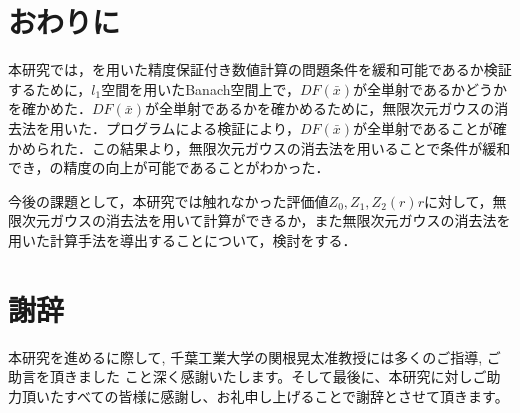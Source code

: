
\chapter{おわりに}

本研究では，\rad{}を用いた精度保証付き数値計算の問題条件を緩和可能であるか検証するために，$l_1$空間を用いたBanach空間上で，$DF(\bar{x})$が全単射であるかどうかを確かめた．$DF(\bar{x})$が全単射であるかを確かめるために，無限次元ガウスの消去法を用いた．プログラムによる検証により，$DF(\bar{x})$が全単射であることが確かめられた．この結果より，無限次元ガウスの消去法を用いることで条件が緩和でき，\rad{}の精度の向上が可能であることがわかった．

今後の課題として，本研究では触れなかった評価値$Z_0, Z_1, Z_2(r)r$に対して，無限次元ガウスの消去法を用いて計算ができるか，また無限次元ガウスの消去法を用いた計算手法を導出することについて，検討をする．

\chapter*{謝辞}
本研究を進めるに際して, 千葉工業大学の関根晃太准教授には多くのご指導, ご助言を頂きました
こと深く感謝いたします。そして最後に、本研究に対しご助力頂いたすべての皆様に感謝し、お礼申し上げることで謝辞とさせて頂きます。
